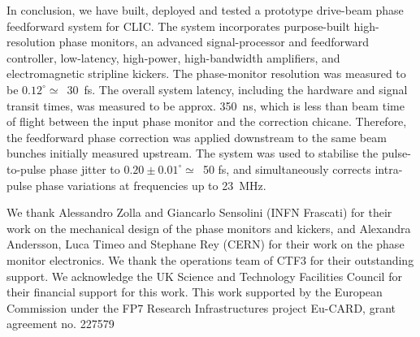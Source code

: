 \documentclass[%
 reprint,
 superscriptaddress,
 amsmath,
 amssymb,
 prl,
]{revtex4-1}
\begin{document}

In conclusion, we have built, deployed and tested a prototype drive-beam phase 
feedforward system for CLIC.   The system incorporates purpose-built 
high-resolution phase 
monitors, an advanced signal-processor and feedforward controller, low-latency, 
high-power, high-bandwidth amplifiers, and electromagnetic stripline
kickers. The phase-monitor resolution was measured to be 
\(0.12^\circ\simeq\)~30~fs.  The overall system latency, including the hardware 
and signal transit times, was measured to be approx. 350~ns, which is less than 
beam time of flight between the input phase monitor and the correction 
chicane.  Therefore, the feedforward phase correction was applied downstream to 
the same beam bunches initially measured upstream. The system was used to 
stabilise the pulse-to-pulse phase jitter to \(0.20\pm0.01^\circ\simeq\)~50 fs, 
and simultaneously corrects intra-pulse phase variations at frequencies up to 
23~MHz. 

\begin{acknowledgments}
	We thank Alessandro Zolla and Giancarlo Sensolini (INFN 
	Frascati) for their work on the mechanical design of the phase monitors and 
	kickers, and Alexandra Andersson, Luca Timeo and Stephane Rey (CERN) for 
	their work on the phase monitor electronics. We thank the operations team 
	of CTF3 for their outstanding support. We acknowledge the UK Science and 
	Technology Facilities Council for their financial support for this work. 
	This work supported by the European Commission under the FP7 Research 
	Infrastructures project Eu-CARD, grant agreement no. 227579
\end{acknowledgments}


\end{document}
